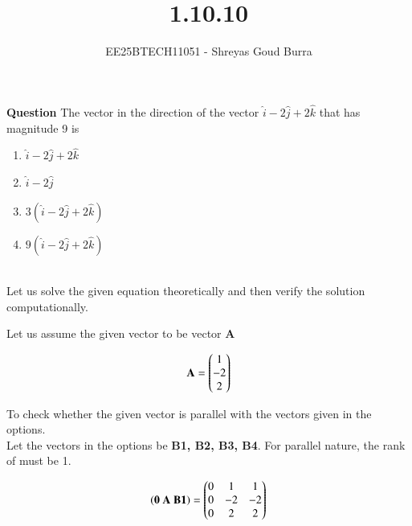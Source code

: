 \documentclass[journal]{IEEEtran}
\begin{document}

\vspace{3cm}

\title{1.10.10}
\author{EE25BTECH11051 - Shreyas Goud Burra}
\maketitle
{\let\newpage\relax\maketitle}

\renewcommand{\thefigure}{\theenumi}
\renewcommand{\thetable}{\theenumi}
\setlength{\intextsep}{10pt} %


\renewcommand{\thetable}{\theenumi}

\textbf{Question}
The vector in the direction of the vector $\hat{i} - 2\hat{j} + 2\hat{k}$ that has magnitude 9 is
\begin{enumerate}[label=(\alph*)]
    \item $\hat{i}-2\hat{j}+2\hat{k}$
    \item $\hat{i}-2\hat{j}$
    \item $3(\hat{i}-2\hat{j}+2\hat{k})$
    \item $9(\hat{i}-2\hat{j}+2\hat{k})$
\end{enumerate}

\solution \\

Let us solve the given equation theoretically and then verify the solution computationally.

Let us assume the given vector to be vector \textbf{A}

\begin{align}
    \textbf{A} = \begin{pmatrix}1 \\ -2 \\ 2\end{pmatrix}
    \label{4.1}
\end{align}

To check whether the given vector is parallel with the vectors given in the options.\\
Let the vectors in the options be \textbf{B1, B2, B3, B4}. For parallel nature, the rank of  must be 1.

\begin{align}
    \left(\textbf{0 A B1}\right) = \begin{pmatrix}0&1&1\\0&-2&-2\\0&2&2\end{pmatrix}
    \label{4.2}
\end{align}
\end{document}
